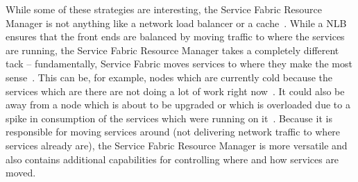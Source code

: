 While some of these strategies are interesting, the Service Fabric
Resource Manager is not anything like a network load balancer or a
cache~\cite{hid-sp18-501-fig2and3}. While a NLB ensures that the front
ends are balanced by moving traffic to where the services are running,
the Service Fabric Resource Manager takes a completely different tack
– fundamentally, Service Fabric moves services to where they make the
most sense~\cite{hid-sp18-501-fig2and3}.  This can be, for example,
nodes which are currently cold because the services which are there
are not doing a lot of work right now~\cite{hid-sp18-501-fig2and3}.
It could also be away from a node which is about to be upgraded or
which is overloaded due to a spike in consumption of the services
which were running on it~\cite{hid-sp18-501-fig2and3}. Because it is
responsible for moving services around (not delivering network traffic
to where services already are), the Service Fabric Resource Manager is
more versatile and also contains additional capabilities for
controlling where and how services are moved.

